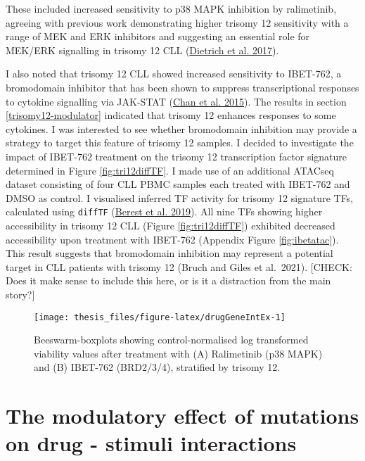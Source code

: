 \documentclass[11pt, a4paper, twosided]{book}
\begin{document}
These included increased sensitivity to p38 MAPK inhibition by ralimetinib, agreeing with previous work demonstrating higher trisomy 12 sensitivity with a range of MEK and ERK inhibitors and suggesting an essential role for MEK/ERK signalling in trisomy 12 CLL (\protect\hyperlink{ref-JCIpaper}{Dietrich et al. 2017}).

I also noted that trisomy 12 CLL showed increased sensitivity to IBET-762, a bromodomain inhibitor that has been shown to suppress transcriptional responses to cytokine signalling via JAK-STAT (\protect\hyperlink{ref-Chan2015}{Chan et al. 2015}). The results in section \ref{trisomy12-modulator} indicated that trisomy 12 enhances responses to some cytokines. I was interested to see whether bromodomain inhibition may provide a strategy to target this feature of trisomy 12 samples. I decided to investigate the impact of IBET-762 treatment on the trisomy 12 transcription factor signature determined in Figure \ref{fig:tri12diffTF}. I made use of an additional ATACseq dataset consisting of four CLL PBMC samples each treated with IBET-762 and DMSO as control. I visualised inferred TF activity for trisomy 12 signature TFs, calculated using \texttt{diffTF} (\protect\hyperlink{ref-Berest2019}{Berest et al. 2019}). All nine TFs showing higher accessibility in trisomy 12 CLL (Figure \ref{fig:tri12diffTF}) exhibited decreased accessibility upon treatment with IBET-762 (Appendix Figure \ref{fig:ibetatac}). This result suggests that bromodomain inhibition may represent a potential target in CLL patients with trisomy 12 (Bruch and Giles et al.~2021). {[}CHECK: Does it make sense to include this here, or is it a distraction from the main story?{]}


\begin{figure}

{\centering \texttt{[image: thesis\_files/figure-latex/drugGeneIntEx-1]} 

}

\caption{Beeswarm-boxplots showing control-normalised log transformed viability values after treatment with (A) Ralimetinib (p38 MAPK) and (B) IBET-762 (BRD2/3/4), stratified by trisomy 12.}\label{fig:drugGeneIntEx}
\end{figure}
\hypertarget{drug-stimulus-gene-interactions}{%
\section{The modulatory effect of mutations on drug - stimuli interactions}\label{drug-stimulus-gene-interactions}}
\end{document}
